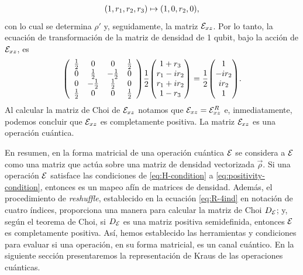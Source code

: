 \begin{align}
\qty(1,r_1,r_2,r_3)\mapsto\qty(1,0,r_2,0),
\label{eq:Bloch-vec-mapToY}
\end{align}
con lo cual se determina $\rho'$ y, seguidamente,
la matriz $\mathcal{E}_{xz}$.
Por lo tanto, la ecuación de transformación de la matriz 
de densidad de 1 qubit, bajo la acción de $\mathcal{E}_{xz}$, es
\begin{align}
\mqty(
\begin{array}{cccc}
\frac{1}{2} & 0 & 0 & \frac{1}{2} \\
0 & \frac{1}{2} & -\frac{1}{2} & 0 \\
0 & -\frac{1}{2} & \frac{1}{2} & 0 \\
\frac{1}{2} & 0 & 0 & \frac{1}{2} \\
\end{array}
)
\frac{1}{2}
\mqty(
1+r_3\\r_1-ir_2\\r_1+ir_2\\1-r_3
)
=
\frac{1}{2}
\mqty(
1\\-ir_2\\ir_2\\1
).
\label{eq:QC-ex2-SR}
\end{align}
Al calcular la matriz de Choi de $\mathcal{E}_{xz}$ notamos 
que $\mathcal{E}_{xz}=\mathcal{E}_{xz}^R$ e, inmediatamente, podemos concluir
que $\mathcal{E}_{xz}$ es completamente positiva. La matriz $\mathcal{E}_{xz}$
es una operación cuántica.

En resumen, en la forma matricial de una operación cuántica $\mathcal{E}$
se considera a $\mathcal{E}$ como una matriz que actúa sobre 
una matriz de densidad vectorizada $\vec{\rho}$. 
Si una operación $\mathcal{E}$ satisface las condiciones de
\eqref{eq:H-condition} a \eqref{eq:positivity-condition}, entonces
es un mapeo afín de matrices de densidad.
Además, el procedimiento de \textit{reshuffle},
establecido en la ecuación \eqref{eq:R-4ind} en notación
de cuatro índices, proporciona una manera para 
calcular la matriz de Choi $D_{\mathcal{E}}$;
y, según el teorema de Choi, si 
$D_{\mathcal{E}}$ es una matriz positiva semidefinida, entonces $\mathcal{E}$ es 
completamente positiva. 
Así, hemos establecido las herramientas y condiciones para evaluar 
si una operación, en su forma matricial, es un canal cuántico.
En la siguiente sección presentaremos la representación de Kraus de las operaciones
cuánticas.

